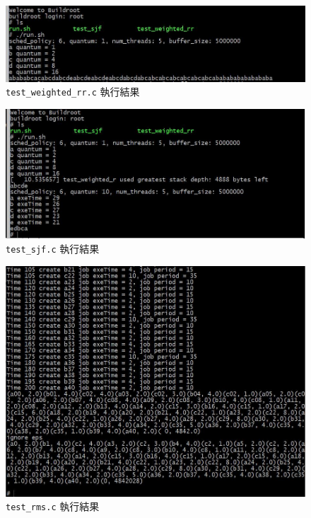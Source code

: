\documentclass{res}
\begin{document}
\begin{resume}
\begin{figure}
    \begin{center}
        \includegraphics[width=400pt]{images/exp-weighted-rr.jpg}
        \caption{\lstinline{test_weighted_rr.c} 執行結果}
        \label{fig: result}
    \end{center}
\end{figure}

\begin{figure}
    \begin{center}
        \includegraphics[width=400pt]{images/exp-sjf.jpg}
        \caption{\lstinline{test_sjf.c} 執行結果}
        \label{fig: result}
    \end{center}
\end{figure}

\begin{figure}
    \begin{center}
        \includegraphics[width=400pt]{images/exp-rms.jpg}
        \caption{\lstinline{test_rms.c} 執行結果}
        \label{fig: result}
    \end{center}
\end{figure}


\end{resume}
\end{document}
